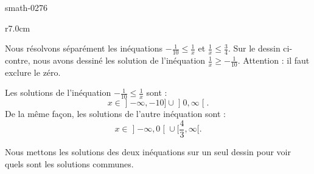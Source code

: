 
\begin{corrige}{smath-0276}

\begin{wrapfigure}{r}{7.0cm}
            \vspace{-2cm}        %
                \centering
                    
                \end{wrapfigure}

    Nous résolvons séparément les inéquations \( -\frac{1}{ 10 }\leq \frac{1}{ x }\) et \( \frac{1}{ x }\leq\frac{ 3 }{ 4 }\). Sur le dessin ci-contre, nous avons dessiné les solution de l'inéquation \( \frac{1}{ x }\geq -\frac{1}{ 10 }\). Attention : il faut exclure le zéro.

Les solutions de l'inéquation \( -\frac{1}{ 10 }\leq \frac{1}{ x }\) sont :
\begin{equation}
    x\in\mathopen] -\infty , -10 \mathclose]\cup\mathopen] 0 , \infty \mathclose[.
\end{equation}
De la même façon, les solutions de l'autre inéquation sont :
\begin{equation}
    x\in\mathopen] -\infty , 0 \mathclose[\cup\mathopen[ \frac{ 4 }{ 3 } , \infty [.
\end{equation}

Nous mettons les solutions des deux inéquations sur un seul dessin pour voir quels sont les solutions communes.

\end{corrige}
